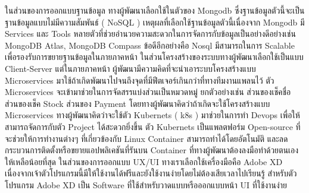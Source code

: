 ในส่วนของการออกแบบฐานข้อมูล ทางผู้พัฒนาเลือกใช้ในตัวของ Mongodb \cite{MongoDB} ซึ่งฐานข้อมูลตัวนี้จะเป็นฐานข้อมูลแบบไม่มีความสัมพันธ์ ( NoSQL ) 
เหตุผลที่เลือกใช้ฐานข้อมูลตัวนี้เนื่องจาก Mongodb มี Services และ Tools หลายตัวที่ช่วยอำนวยความสะดวกในการจัดการกับข้อมูลเป็นอย่างดีอย่างเช่น MongoDB Atlas, MongoDB Compass 
ข้อดีอีกอย่างคือ Nosql มีสามารถในการ Scalable เพื่อรองรับการขยายฐานข้อมูลในภายภาคหน้า  ในส่วนโครงสร้างของระบบทางผู้พัฒนาเลือกใช้เป็นแบบ Client-Server \cite{Client-Server} แต่ในภายภาคหน้า  ผู้พัฒนามีความคิดที่จะนำเอาระบบโครงสร้างแบบ Microservices \cite{Microservice} มาใช้ถ้าเกิดพัฒนาไปจนถึงจุดที่มีฟีตเจอร์เกินกว่าที่ทางทีมงานแพลนไว้  
ตัว Microservices จะเข้ามาช่วยในการจัดสรรแบ่งส่วนเป็นหมวดหมู่  ยกตัวอย่างเช่น  ส่วนของเช็คชื่อ  ส่วนของเช็ค Stock  ส่วนของ Payment  โดยทางผู้พัฒนาคิดว่าถ้าเกิดจะใช้โครงสร้างแบบ Microservices ทางผู้พัฒนาคิดว่าจะใช้ตัว Kubernets ( k8s ) มาช่วยในการทำ Devops เพื่อให้สามารถจัดการกับตัว Project ได้สะดวกยิ่งขึ้น 
ตัว Kubernets เป็นแพลตฟอร์ม Open-source ที่จะช่วยให้การทำงานต่างๆ ที่เกี่ยวข้องกับ Linux Container สามารถทำได้โดยอัตโนมัติ และลดกระบวนการติดตั้งหรือขยายแอปพลิเคชันที่รันบน Container ที่ทางผู้พัฒนาต้องลงมือทำด้วยตนเองให้เหลือน้อยที่สุด 
	ในส่วนของการออกแบบ UX/UI ทางเราเลือกใช้เครื่องมือคือ Adobe XD \cite{AdobeXD} เนื่องจากเจ้าตัวโปรแกรมนี้มีให้ใช้งานได้ฟรีและยังใช้งานง่ายโดยไม่ต้องเสียเวลาไปเรียนรู้ สำหรับตัวโปรแกรม Adobe XD เป็น Software ที่ใช้สำหรับวาดแบบหรือออกแบบหน้า UI ที่ใช้งานง่าย 
  
  
  

